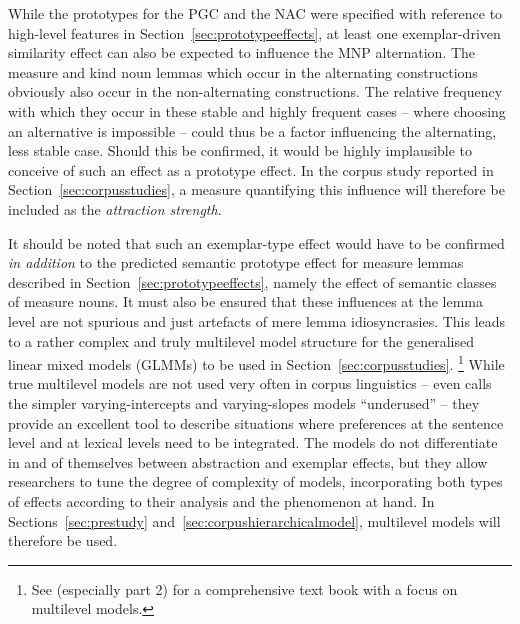 While the prototypes for the PGC and the NAC were specified with reference to high-level features in Section~\ref{sec:prototypeeffects}, at least one exemplar-driven similarity effect can also be expected to influence the MNP alternation.
The measure and kind noun lemmas which occur in the alternating constructions obviously also occur in the non-alternating constructions.
The relative frequency with which they occur in these stable and highly frequent cases -- where choosing an alternative is impossible -- could thus be a factor influencing the alternating, less stable case.
Should this be confirmed, it would be highly implausible to conceive of such an effect as a prototype effect.
In the corpus study reported in Section~\ref{sec:corpusstudies}, a measure quantifying this influence will therefore be included as the \textit{attraction strength}.

It should be noted that such an exemplar-type effect would have to be confirmed \textit{in addition} to the predicted semantic prototype effect for measure lemmas described in Section~\ref{sec:prototypeeffects}, namely the effect of semantic classes of measure nouns.
It must also be ensured that these influences at the lemma level are not spurious and just artefacts of mere lemma idiosyncrasies.
This leads to a rather complex and truly multilevel model structure for the generalised linear mixed models (GLMMs) to be used in Section~\ref{sec:corpusstudies}.%
\footnote{See \citet{GelmanHill2006} (especially part 2) for a comprehensive text book with a focus on multilevel models.}
While true multilevel models are not used very often in corpus linguistics -- \citet{Gries2015} even calls the simpler varying-intercepts and varying-slopes models ``underused'' -- they provide an excellent tool to describe situations where preferences at the sentence level and at lexical levels need to be integrated.
The models do not differentiate in and of themselves between abstraction and exemplar effects, but they allow researchers to tune the degree of complexity of models, incorporating both types of effects according to their analysis and the phenomenon at hand.
In Sections~\ref{sec:prestudy} and~\ref{sec:corpushierarchicalmodel}, multilevel models will therefore be used.
